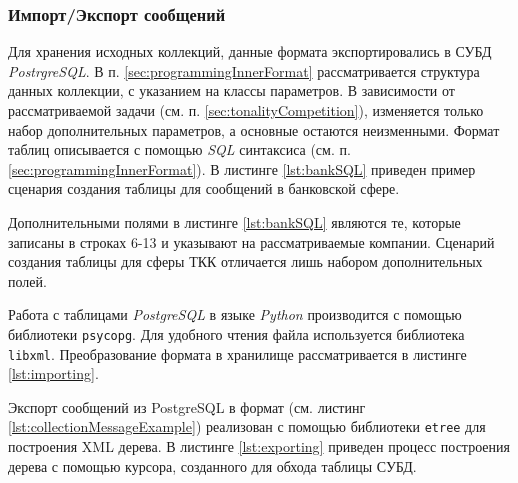     \subsubsection{Импорт/Экспорт сообщений}
    \label{sec:devImporting}
    Для хранения исходных коллекций, данные формата \xml экспортировались в
    СУБД {\it PostrgreSQL}.
    В п. \ref{sec:programmingInnerFormat} рассматривается структура данных
    коллекции, с указанием на классы параметров.
    В зависимости от рассматриваемой задачи (см. п. \ref{sec:tonalityCompetition}),
    изменяется только набор дополнительных параметров, а основные остаются
    неизменными.
    Формат таблиц описывается с помощью {\it SQL} синтаксиса (см. п.
    \ref{sec:programmingInnerFormat}).
    В листинге \ref{lst:bankSQL} приведен пример сценария создания таблицы
    для сообщений в банковской сфере.


    \lstset{language=sql}
    

    Дополнительными полями в листинге \ref{lst:bankSQL} являются те,
    которые записаны в строках 6-13 и указывают на рассматриваемые компании.
    Сценарий создания таблицы для сферы ТКК отличается лишь набором дополнительных
    полей.

    Работа с таблицами {\it PostgreSQL} в языке {\it Python} производится с помощью
    библиотеки {\tt psycopg}.
    Для удобного чтения \xml файла используется библиотека {\tt libxml}.
    Преобразование \xml формата в хранилище рассматривается в листинге
    \ref{lst:importing}.

    \lstset{style=python}
    

    Экспорт сообщений из PostgreSQL в \xml формат (см. листинг
    \ref{lst:collectionMessageExample}) реализован с помощью библиотеки {\tt etree}
    для построения XML дерева.
    В листинге \ref{lst:exporting} приведен процесс построения дерева с помощью
    курсора, созданного для обхода таблицы СУБД.

    \lstset{style=python}
    

